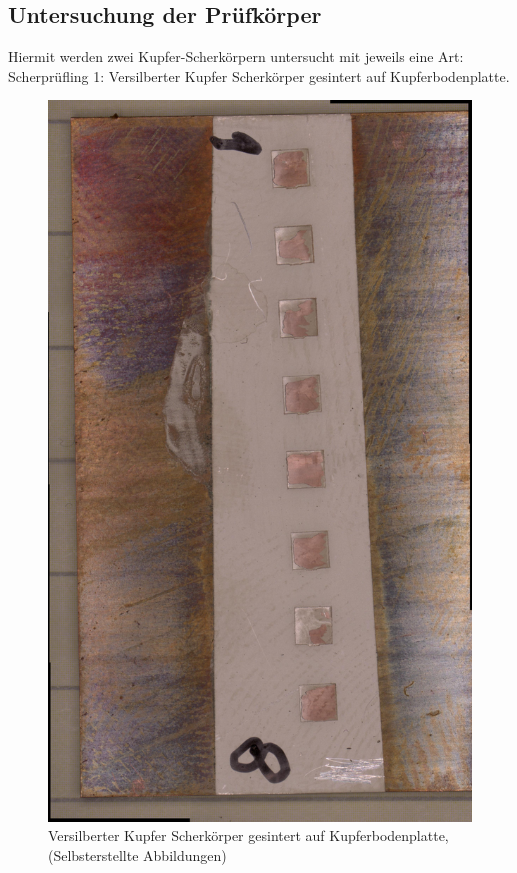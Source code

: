 \subsection{Untersuchung der Prüfkörper}
Hiermit werden zwei Kupfer-Scherkörpern untersucht mit jeweils eine Art:\\
Scherprüfling 1: Versilberter Kupfer Scherkörper gesintert auf Kupferbodenplatte.\\
\vspace{0.05cm}
\begin{figure}[h]
    \centering
    \includegraphics[scale=0.1, angle=90]{Bilder/Bodenplatte_Sintern_Gesamt.jpg}
    \caption{Versilberter Kupfer Scherkörper gesintert auf Kupferbodenplatte, (Selbsterstellte Abbildungen)}
    \vspace{0.2cm}
    \label{Abb.2: Versilberter Kupfer Scherkörper gesintert auf Kupferbodenplatte} 
\end{figure}\\

